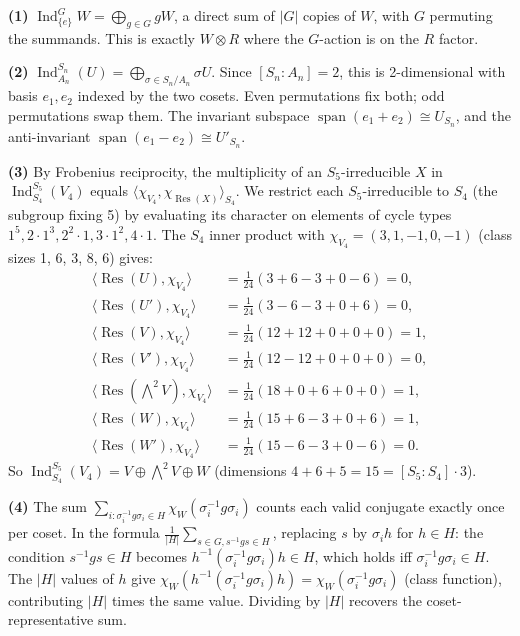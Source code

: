 \documentclass{report}
\begin{document}
\begin{solution}
\textbf{(1)} \(\operatorname{Ind}^G_{\{e\}} W = \bigoplus_{g \in G} gW\), a direct sum of \(|G|\) copies of \(W\), with \(G\) permuting the summands. This is exactly \(W \otimes R\) where the \(G\)-action is on the \(R\) factor.

\textbf{(2)} \(\operatorname{Ind}^{S_n}_{A_n}(U) = \bigoplus_{\sigma \in S_n/A_n} \sigma U\). Since \([S_n:A_n] = 2\), this is 2-dimensional with basis \(e_1, e_2\) indexed by the two cosets. Even permutations fix both; odd permutations swap them. The invariant subspace \(\operatorname{span}(e_1 + e_2) \cong U_{S_n}\), and the anti-invariant \(\operatorname{span}(e_1 - e_2) \cong U'_{S_n}\).

\textbf{(3)} By Frobenius reciprocity, the multiplicity of an \(S_5\)-irreducible \(X\) in \(\operatorname{Ind}^{S_5}_{S_4}(V_4)\) equals \(\langle \chi_{V_4}, \chi_{\operatorname{Res}(X)} \rangle_{S_4}\). We restrict each \(S_5\)-irreducible to \(S_4\) (the subgroup fixing 5) by evaluating its character on elements of cycle types \(1^5, 2 \cdot 1^3, 2^2 \cdot 1, 3 \cdot 1^2, 4 \cdot 1\). The \(S_4\) inner product with \(\chi_{V_4} = (3, 1, -1, 0, -1)\) (class sizes 1, 6, 3, 8, 6) gives:
\begin{align*}
\langle \operatorname{Res}(U), \chi_{V_4} \rangle &= \tfrac{1}{24}(3 + 6 - 3 + 0 - 6) = 0, \\
\langle \operatorname{Res}(U'), \chi_{V_4} \rangle &= \tfrac{1}{24}(3 - 6 - 3 + 0 + 6) = 0, \\
\langle \operatorname{Res}(V), \chi_{V_4} \rangle &= \tfrac{1}{24}(12 + 12 + 0 + 0 + 0) = 1, \\
\langle \operatorname{Res}(V'), \chi_{V_4} \rangle &= \tfrac{1}{24}(12 - 12 + 0 + 0 + 0) = 0, \\
\langle \operatorname{Res}(\textstyle\bigwedge^2 V), \chi_{V_4} \rangle &= \tfrac{1}{24}(18 + 0 + 6 + 0 + 0) = 1, \\
\langle \operatorname{Res}(W), \chi_{V_4} \rangle &= \tfrac{1}{24}(15 + 6 - 3 + 0 + 6) = 1, \\
\langle \operatorname{Res}(W'), \chi_{V_4} \rangle &= \tfrac{1}{24}(15 - 6 - 3 + 0 - 6) = 0.
\end{align*}
So \(\operatorname{Ind}^{S_5}_{S_4}(V_4) = V \oplus \bigwedge^2 V \oplus W\) (dimensions \(4 + 6 + 5 = 15 = [S_5:S_4] \cdot 3\)).

\textbf{(4)} The sum \(\sum_{i : \sigma_i^{-1}g\sigma_i \in H} \chi_W(\sigma_i^{-1}g\sigma_i)\) counts each valid conjugate exactly once per coset. In the formula \(\frac{1}{|H|}\sum_{s \in G, s^{-1}gs \in H}\), replacing \(s\) by \(\sigma_i h\) for \(h \in H\): the condition \(s^{-1}gs \in H\) becomes \(h^{-1}(\sigma_i^{-1}g\sigma_i)h \in H\), which holds iff \(\sigma_i^{-1}g\sigma_i \in H\). The \(|H|\) values of \(h\) give \(\chi_W(h^{-1}(\sigma_i^{-1}g\sigma_i)h) = \chi_W(\sigma_i^{-1}g\sigma_i)\) (class function), contributing \(|H|\) times the same value. Dividing by \(|H|\) recovers the coset-representative sum.


\end{solution}
\end{document}
